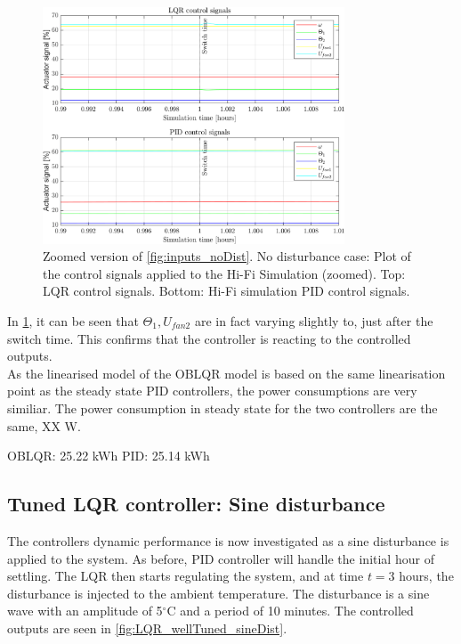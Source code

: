 \begin{figure}[H]
	\centering
	\includegraphics[width=0.8\textwidth]{Graphics/fig_inputs_noDist_zoom.png}
	\caption{Zoomed version of \cref{fig:inputs_noDist}. No disturbance case: Plot of the control signals applied to the Hi-Fi Simulation (zoomed). Top: LQR control signals. Bottom: Hi-Fi simulation PID control signals.}
	\label{fig:inputs_noDist_zoom}
\end{figure}
 
In \cref{fig:inputs_noDist_zoom}, it can be seen that $ \Theta_1, U_{fan2} $ are in fact varying slightly to, just after the switch time. This confirms that the controller is reacting to the controlled outputs. \\
\noindent As the linearised model of the OBLQR model is based on the same linearisation point as the steady state PID controllers, the power consumptions are very similiar. The power consumption in steady state for the two controllers are the same, XX W.

OBLQR: 25.22 kWh
PID: 25.14 kWh


\newpage
\subsection{Tuned LQR controller: Sine disturbance}
The controllers dynamic performance is now investigated as a sine disturbance is applied to the system. As before, PID controller will handle the initial hour of settling. The LQR then starts regulating the system, and at time $t=3$ hours, the disturbance is injected to the ambient temperature. The disturbance is a sine wave with an amplitude of 5$^{\circ}$C and a period of 10 minutes. The controlled outputs are seen in \cref{fig:LQR_wellTuned_sineDist}.

